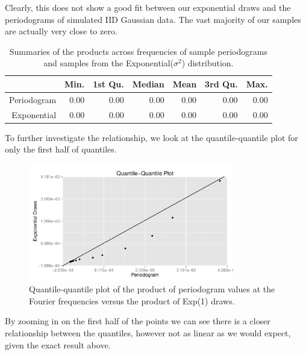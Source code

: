 \documentclass{article}\usepackage[]{graphicx}\usepackage[]{color}
\newenvironment{knitrout}{}{} %
\theoremstyle{plain}
\begin{document}
Clearly, this does not show a good fit between our exponential draws and the periodograms of simulated IID Gaussian data. The vast majority of our samples are actually very close to zero.
\begin{table}[H]
\centering
\begin{tabular}{rrrrrrr}
  \hline
 & Min. & 1st Qu. & Median & Mean & 3rd Qu. & Max. \\ 
  \hline
Periodogram & 0.00 & 0.00 & 0.00 & 0.00 & 0.00 & 0.00 \\ 
  Exponential & 0.00 & 0.00 & 0.00 & 0.00 & 0.00 & 0.00 \\ 
   \hline
\end{tabular}
\caption{Summaries of the products across frequencies of sample periodograms and samples from the Exponential($\sigma^2$) distribution.} 
\end{table}


To further investigate the relationship, we look at the quantile-quantile plot for only the first half of quantiles.
\begin{knitrout}
\color{fgcolor}\begin{figure}[H]


{\centering \includegraphics[width=0.8\textwidth]{figure/qqplot2} 

}

\caption[Quantile-quantile plot of the product of periodogram values at the Fourier frequencies versus the product of Exp(1) draws]{Quantile-quantile plot of the product of periodogram values at the Fourier frequencies versus the product of Exp(1) draws.\label{fig:qqplot2}}
\end{figure}


\end{knitrout}

By zooming in on the first half of the points we can see there is a closer relationship between the quantiles, however not as linear as we would expect, given the exact result above. 
\end{document}

